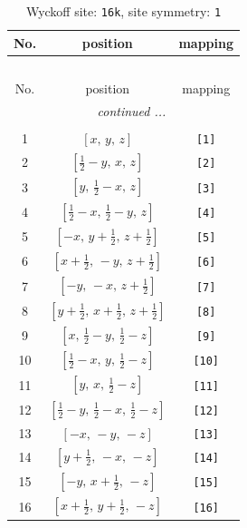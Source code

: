 \documentclass[fleqn,8pt]{jsarticle}
\begin{document}
\begin{longtable}{ccc}
\caption{Wyckoff site: {\tt 16k}, site symmetry: {\tt 1}}
 \\
 \hline \hline
No. & position & mapping \\ \hline \endfirsthead

\multicolumn{2}{l}{\tablename\ \thetable{}} \\
 \hline \hline
No. & position & mapping \\ \hline \endhead

 \hline \hline
\multicolumn{2}{r}{\footnotesize\it continued ...} \\ \endfoot

 \hline \hline
\multicolumn{2}{r}{} \\ \endlastfoot

1 & $\left[ x,\, y,\, z \right]$ & {\tt [1]} \\ \hline
2 & $\left[ \frac{1}{2} - y,\, x,\, z \right]$ & {\tt [2]} \\ \hline
3 & $\left[ y,\, \frac{1}{2} - x,\, z \right]$ & {\tt [3]} \\ \hline
4 & $\left[ \frac{1}{2} - x,\, \frac{1}{2} - y,\, z \right]$ & {\tt [4]} \\ \hline
5 & $\left[ - x,\, y + \frac{1}{2},\, z + \frac{1}{2} \right]$ & {\tt [5]} \\ \hline
6 & $\left[ x + \frac{1}{2},\, - y,\, z + \frac{1}{2} \right]$ & {\tt [6]} \\ \hline
7 & $\left[ - y,\, - x,\, z + \frac{1}{2} \right]$ & {\tt [7]} \\ \hline
8 & $\left[ y + \frac{1}{2},\, x + \frac{1}{2},\, z + \frac{1}{2} \right]$ & {\tt [8]} \\ \hline
9 & $\left[ x,\, \frac{1}{2} - y,\, \frac{1}{2} - z \right]$ & {\tt [9]} \\ \hline
10 & $\left[ \frac{1}{2} - x,\, y,\, \frac{1}{2} - z \right]$ & {\tt [10]} \\ \hline
11 & $\left[ y,\, x,\, \frac{1}{2} - z \right]$ & {\tt [11]} \\ \hline
12 & $\left[ \frac{1}{2} - y,\, \frac{1}{2} - x,\, \frac{1}{2} - z \right]$ & {\tt [12]} \\ \hline
13 & $\left[ - x,\, - y,\, - z \right]$ & {\tt [13]} \\ \hline
14 & $\left[ y + \frac{1}{2},\, - x,\, - z \right]$ & {\tt [14]} \\ \hline
15 & $\left[ - y,\, x + \frac{1}{2},\, - z \right]$ & {\tt [15]} \\ \hline
16 & $\left[ x + \frac{1}{2},\, y + \frac{1}{2},\, - z \right]$ & {\tt [16]} \\
\end{longtable}
\end{document}
